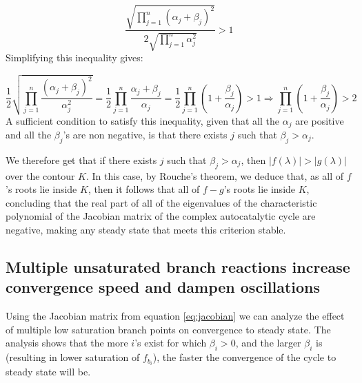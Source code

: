  \begin{equation*}
   \frac{\sqrt{\prod_{j=1}^n(\alpha_j+\beta_j)^2}}{2\sqrt{\prod_{j=1}^n\alpha_j^2}}>1
 \end{equation*}
 Simplifying this inequality gives:

 \begin{equation*}
     \frac{1}{2}\sqrt{\prod_{j=1}^n\frac{(\alpha_j+\beta_j)^2}{\alpha_j^2}}= \frac{1}{2}\prod_{j=1}^n\frac{\alpha_j+\beta_j}{\alpha_j}= \frac{1}{2}\prod_{j=1}^n(1+\frac{\beta_j}{\alpha_j})>1 \Rightarrow \prod_{j=1}^n(1+\frac{\beta_j}{\alpha_j})>2
 \end{equation*}
 A sufficient condition to satisfy this inequality, given that all the $\alpha_j$ are positive and all the $\beta_j$'s are non negative, is that there exists $j$ such that $\beta_j > \alpha_j$.

 We therefore get that if there exists $j$ such that  $\beta_j > \alpha_j$, then $|f(\lambda)|>|g(\lambda)|$ over the contour $K$.
 In this case, by Rouche's theorem, we deduce that, as all of $f$'s roots lie inside $K$, then it follows that all of $f-g$'s roots lie inside $K$, concluding that the real part of all of the eigenvalues of the characteristic polynomial of the Jacobian matrix of the complex autocatalytic cycle are negative, making any steady state that meets this criterion stable.

  \label{sec:complexderivatives}
 \subsection{Multiple unsaturated branch reactions increase convergence speed and dampen oscillations}
 Using the Jacobian matrix from equation \ref{eq:jacobian} we can analyze the effect of multiple low saturation branch points on convergence to steady state.
 The analysis shows that the more $i$'s exist for which $\beta_i>0$, and the larger $\beta_i$ is (resulting in lower saturation of $f_{b_i}$), the faster the convergence of the cycle to steady state will be.

